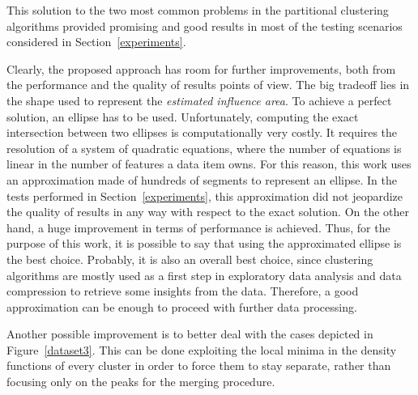 This solution to the two most common problems in the partitional clustering
algorithms provided promising and good results in most of the testing
scenarios considered in Section~\ref{experiments}.

Clearly, the proposed approach has room for further improvements, both from
the performance and the quality of results points of view. The big tradeoff
lies in the shape used to represent the \emph{estimated influence area}. To
achieve a perfect solution, an ellipse has to be used. Unfortunately, computing
the exact intersection between two ellipses is computationally very costly.
It requires the resolution of a system of quadratic equations, where the number
of equations is linear in the number of features a data item owns.
For this reason, this work uses an approximation made of hundreds of segments
to represent an ellipse. In the tests performed in Section~\ref{experiments},
this approximation did not jeopardize the quality of results in any way with
respect to the exact solution. On the other hand, a huge improvement in terms
of performance is achieved. Thus, for the purpose of this work, it is possible
to say that using the approximated ellipse is the best choice. Probably, it is
also an overall best choice, since clustering algorithms are mostly used as 
a first step in exploratory data analysis and data compression to retrieve 
some insights from the data. Therefore, a good approximation can be enough 
to proceed with further data processing.

Another possible improvement is to better deal with the cases depicted in
Figure~\ref{dataset3}. This can be done exploiting the local minima
in the density functions of every cluster in order to force them to stay 
separate, rather than focusing only on the peaks for the merging procedure.